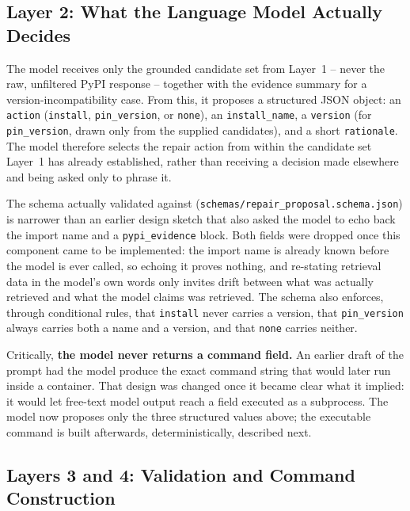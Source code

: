 \subsection{Layer 2: What the Language Model Actually Decides}

The model receives only the grounded candidate set from Layer~1 -- never
the raw, unfiltered PyPI response -- together with the evidence summary for
a version-incompatibility case. From this, it proposes a structured JSON
object: an \texttt{action} (\texttt{install}, \texttt{pin\_version}, or
\texttt{none}), an \texttt{install\_name}, a \texttt{version} (for
\texttt{pin\_version}, drawn only from the supplied candidates), and a short
\texttt{rationale}. The model therefore selects the repair action from
within the candidate set Layer~1 has already established, rather than
receiving a decision made elsewhere and being asked only to phrase it.

The schema actually validated against
(\texttt{schemas/repair\_proposal.schema.json}) is narrower than an earlier
design sketch that also asked the model to echo back the import name and a
\texttt{pypi\_evidence} block. Both fields were dropped once this component
came to be implemented: the import name is already known before the model
is ever called, so echoing it proves nothing, and re-stating retrieval data
in the model's own words only invites drift between what was actually
retrieved and what the model claims was retrieved. The schema also
enforces, through conditional rules, that \texttt{install} never carries a
version, that \texttt{pin\_version} always carries both a name and a
version, and that \texttt{none} carries neither.

Critically, \textbf{the model never returns a command field.} An earlier
draft of the prompt had the model produce the exact command string that
would later run inside a container. That design was changed once it became
clear what it implied: it would let free-text model output reach a field
executed as a subprocess. The model now proposes only the three structured
values above; the executable command is built afterwards, deterministically,
described next.

\subsection{Layers 3 and 4: Validation and Command Construction}

